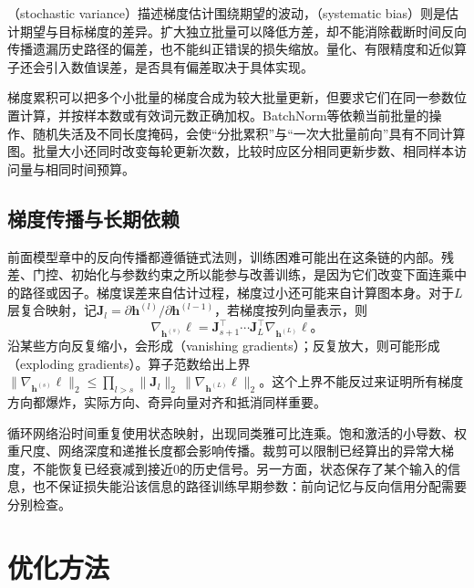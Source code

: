 （stochastic variance）描述梯度估计围绕期望的波动，（systematic bias）则是估计期望与目标梯度的差异。扩大独立批量可以降低方差，却不能消除截断时间反向传播遗漏历史路径的偏差，也不能纠正错误的损失缩放。量化、有限精度和近似算子还会引入数值误差，是否具有偏差取决于具体实现。

梯度累积可以把多个小批量的梯度合成为较大批量更新，但要求它们在同一参数位置计算，并按样本数或有效词元数正确加权。BatchNorm等依赖当前批量的操作、随机失活及不同长度掩码，会使“分批累积”与“一次大批量前向”具有不同计算图。批量大小还同时改变每轮更新次数，比较时应区分相同更新步数、相同样本访问量与相同时间预算。

\subsection{梯度传播与长期依赖}
\label{sec:training-gradient-propagation}

前面模型章中的反向传播都遵循链式法则，训练困难可能出在这条链的内部。残差、门控、初始化与参数约束之所以能参与改善训练，是因为它们改变下面连乘中的路径或因子。梯度误差来自估计过程，梯度过小还可能来自计算图本身。对于$L$层复合映射，记$\bm J_l=\partial\bm h^{(l)}/\partial\bm h^{(l-1)}$，若梯度按列向量表示，则
\begin{equation}
  \nabla_{\bm h^{(s)}}\ell
  =\bm J_{s+1}^{\top}\cdots\bm J_L^{\top}
    \nabla_{\bm h^{(L)}}\ell\text{。}
  \label{eq:training-jacobian-chain}
\end{equation}
沿某些方向反复缩小，会形成（vanishing gradients）；反复放大，则可能形成（exploding gradients）。算子范数给出上界$\lVert\nabla_{\bm h^{(s)}}\ell\rVert_2\leq\prod_{l>s}\lVert\bm J_l\rVert_2\,\lVert\nabla_{\bm h^{(L)}}\ell\rVert_2$。这个上界不能反过来证明所有梯度方向都爆炸，实际方向、奇异向量对齐和抵消同样重要。

循环网络沿时间重复使用状态映射，出现同类雅可比连乘。饱和激活的小导数、权重尺度、网络深度和递推长度都会影响传播。裁剪可以限制已经算出的异常大梯度，不能恢复已经衰减到接近0的历史信号。另一方面，状态保存了某个输入的信息，也不保证损失能沿该信息的路径训练早期参数：前向记忆与反向信用分配需要分别检查。

\section{优化方法}
\label{sec:training-optimizers}

